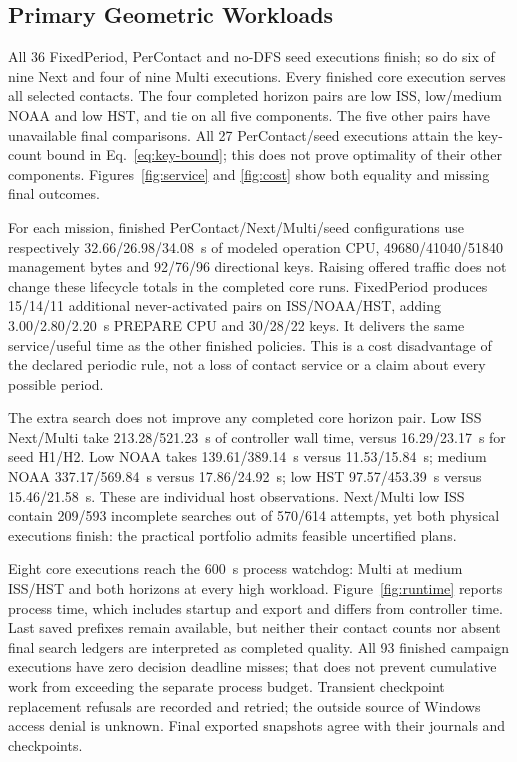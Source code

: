 \documentclass[conference]{IEEEtran}
\begin{document}
\subsection{Primary Geometric Workloads}
All 36 FixedPeriod, PerContact and no-DFS seed executions finish; so do six of nine Next and four of nine Multi executions. Every finished core execution serves all selected contacts. The four completed horizon pairs are low ISS, low/medium NOAA and low HST, and tie on all five components. The five other pairs have unavailable final comparisons. All 27 PerContact/seed executions attain the key-count bound in Eq.~\eqref{eq:key-bound}; this does not prove optimality of their other components. Figures~\ref{fig:service} and \ref{fig:cost} show both equality and missing final outcomes.

For each mission, finished PerContact/Next/Multi/seed configurations use respectively 32.66/26.98/34.08~s of modeled operation CPU, 49680/41040/51840 management bytes and 92/76/96 directional keys. Raising offered traffic does not change these lifecycle totals in the completed core runs. FixedPeriod produces 15/14/11 additional never-activated pairs on ISS/NOAA/HST, adding 3.00/2.80/2.20~s PREPARE CPU and 30/28/22 keys. It delivers the same service/useful time as the other finished policies. This is a cost disadvantage of the declared periodic rule, not a loss of contact service or a claim about every possible period.

The extra search does not improve any completed core horizon pair. Low ISS Next/Multi take 213.28/521.23~s of controller wall time, versus 16.29/23.17~s for seed H1/H2. Low NOAA takes 139.61/389.14~s versus 11.53/15.84~s; medium NOAA 337.17/569.84~s versus 17.86/24.92~s; low HST 97.57/453.39~s versus 15.46/21.58~s. These are individual host observations. Next/Multi low ISS contain 209/593 incomplete searches out of 570/614 attempts, yet both physical executions finish: the practical portfolio admits feasible uncertified plans.

Eight core executions reach the 600~s process watchdog: Multi at medium ISS/HST and both horizons at every high workload. Figure~\ref{fig:runtime} reports process time, which includes startup and export and differs from controller time. Last saved prefixes remain available, but neither their contact counts nor absent final search ledgers are interpreted as completed quality. All 93 finished campaign executions have zero decision deadline misses; that does not prevent cumulative work from exceeding the separate process budget. Transient checkpoint replacement refusals are recorded and retried; the outside source of Windows access denial is unknown. Final exported snapshots agree with their journals and checkpoints.
\end{document}
